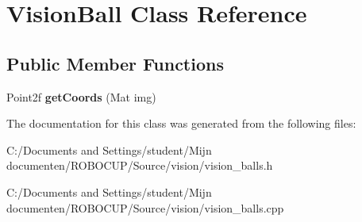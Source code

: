 \hypertarget{class_vision_ball}{\section{Vision\-Ball Class Reference}
\label{class_vision_ball}
}
\subsection*{Public Member Functions}
\begin{DoxyCompactItemize}
\item 
\hypertarget{class_vision_ball_a241282905ee3b294593ac3a26a35f39e}{Point2f {\bfseries get\-Coords} (Mat img)}\label{class_vision_ball_a241282905ee3b294593ac3a26a35f39e}

\end{DoxyCompactItemize}


The documentation for this class was generated from the following files\-:\begin{DoxyCompactItemize}
\item 
C\-:/\-Documents and Settings/student/\-Mijn documenten/\-R\-O\-B\-O\-C\-U\-P/\-Source/vision/vision\-\_\-balls.\-h\item 
C\-:/\-Documents and Settings/student/\-Mijn documenten/\-R\-O\-B\-O\-C\-U\-P/\-Source/vision/vision\-\_\-balls.\-cpp\end{DoxyCompactItemize}
